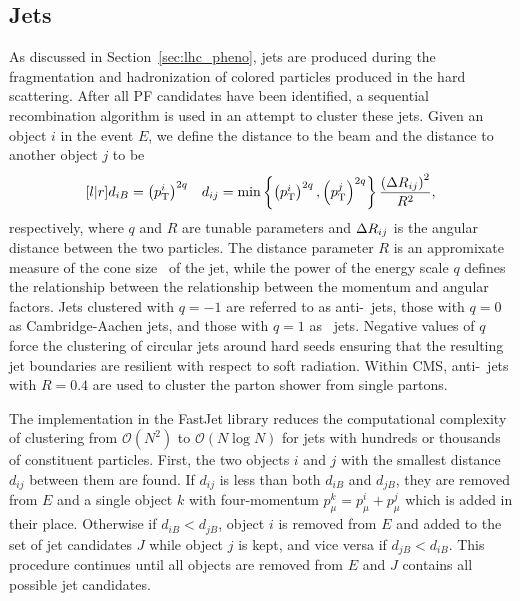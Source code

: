 \subsection{Jets}
\label{sec:pf_jets}

As discussed in Section~\ref{sec:lhc_pheno}, jets are produced during the fragmentation and hadronization of colored particles produced in the hard scattering.
After all PF candidates have been identified, a sequential recombination algorithm is used in an attempt to cluster these jets.
Given an object $i$ in the event $E$, we define the distance to the beam and the distance to another object $j$ to be
\begin{equation}
  \begin{matrix}[l | r]
    \displaystyle
    d_{iB} = \left(p_{\mathrm{T}}^i\right)^{2q} &
    d_{ij} = \min \left\{\left(p_{\mathrm{T}}^i\right)^{2q}, \left(p_{\mathrm{T}}^j\right)^{2q} \right\} \dfrac{\left(\Delta R_{ij}\right)^2}{R^2} ,
  \end{matrix}
\end{equation}
respectively, where $q$ and $R$ are tunable parameters and $\Delta R_{ij}$ is the angular distance between the two particles.
The distance parameter $R$ is an appromixate measure of the cone size \dR\ of the jet, while the power of the energy scale $q$ defines the relationship between the relationship between the momentum and angular factors.
Jets clustered with $q = -1$ are referred to as anti-\kt\ jets, those with $q = 0$ as Cambridge-Aachen jets, and those with $q = 1$ as \kt\ jets.  
Negative values of $q$ force the clustering of circular jets around hard seeds ensuring that the resulting jet boundaries are resilient with respect to soft radiation.
Within CMS, anti-\kt\ jets with $R = 0.4$ are used to cluster the parton shower from single partons.

The implementation in the FastJet library reduces the computational complexity of clustering from $\mathcal{O}(N^2)$ to $\mathcal{O}(N \log N)$ for jets with hundreds or thousands of constituent particles.
First, the two objects $i$ and $j$ with the smallest distance $d_{ij}$ between them are found. 
If $d_{ij}$ is less than both $d_{iB}$ and $d_{jB}$, they are removed from $E$ and a single object $k$ with four-momentum $p_\mu^k = p_\mu^i + p_\mu^j$ which is added in their place. 
Otherwise if $d_{iB} < d_{jB}$, object $i$ is removed from $E$ and added to the set of jet candidates $J$ while object $j$ is kept, and vice versa if $d_{jB} < d_{iB}$.
This procedure continues until all objects are removed from $E$ and $J$ contains all possible jet candidates.

